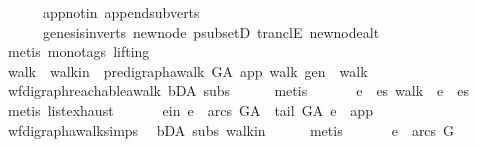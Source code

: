 \begin{isabellebody}
\ \ \ \ \ \ app{\isacharunderscore}{\kern0pt}notin\ append{\isacharunderscore}{\kern0pt}subverts\isanewline
\ \ \ \ \ \ genesis{\isacharunderscore}{\kern0pt}in{\isacharunderscore}{\kern0pt}verts\ new{\isacharunderscore}{\kern0pt}node\ psubsetD\ tranclE\ new{\isacharunderscore}{\kern0pt}node{\isacharunderscore}{\kern0pt}alt\isanewline
\ \ \ \ \isamarkupfalse%
\ {\isacharparenleft}{\kern0pt}metis\ {\isacharparenleft}{\kern0pt}mono{\isacharunderscore}{\kern0pt}tags{\isacharcomma}{\kern0pt}\ lifting{\isacharparenright}{\kern0pt}{\isacharparenright}{\kern0pt}\isanewline
\ \ \isamarkupfalse%
\ \isamarkupfalse%
\ walk\ \ walk{\isacharunderscore}{\kern0pt}in{\isacharcolon}{\kern0pt}\ {\isachardoublequoteopen}\ pre{\isacharunderscore}{\kern0pt}digraph{\isachardot}{\kern0pt}awalk\ G{\isacharunderscore}{\kern0pt}A\ app\ walk\ gen\ {\isasymand}\ walk\ {\isasymnoteq}\ {\isacharbrackleft}{\kern0pt}{\isacharbrackright}{\kern0pt}{\isachardoublequoteclose}\ \isanewline
\ \ \ \ \isamarkupfalse%
\ wf{\isacharunderscore}{\kern0pt}digraph{\isachardot}{\kern0pt}reachable{}{\isacharunderscore}{\kern0pt}awalk\ bD{\isacharunderscore}{\kern0pt}A\ subs\isanewline
\ \ \ \ \isamarkupfalse%
\ metis\ \isanewline
\ \ \isamarkupfalse%
\ \isamarkupfalse%
\ e\ \ {\isachardoublequoteopen}{\isasymexists}es{\isachardot}{\kern0pt}\ walk\ {\isacharequal}{\kern0pt}\ e\ {\isacharhash}{\kern0pt}\ es{\isachardoublequoteclose}\isanewline
\ \ \ \ \isamarkupfalse%
\ {\isacharparenleft}{\kern0pt}metis\ list{\isachardot}{\kern0pt}exhaust{\isacharparenright}{\kern0pt}\ \isanewline
\ \ \isamarkupfalse%
\ \isamarkupfalse%
\ e{\isacharunderscore}{\kern0pt}in{\isacharcolon}{\kern0pt}\ {\isachardoublequoteopen}e\ {\isasymin}\ arcs\ G{\isacharunderscore}{\kern0pt}A\ {\isasymand}\ tail\ G{\isacharunderscore}{\kern0pt}A\ e\ {\isacharequal}{\kern0pt}\ app{\isachardoublequoteclose}\isanewline
\ \ \ \ \isamarkupfalse%
\ wf{\isacharunderscore}{\kern0pt}digraph{\isachardot}{\kern0pt}awalk{\isacharunderscore}{\kern0pt}simps{\isacharparenleft}{\kern0pt}{}{\isacharparenright}{\kern0pt}\isanewline
\ \ bD{\isacharunderscore}{\kern0pt}A\ subs\ walk{\isacharunderscore}{\kern0pt}in\isanewline
\ \ \ \ \isamarkupfalse%
\ metis\ \isanewline
\ \ \isamarkupfalse%
\ \isamarkupfalse%
\ {\isachardoublequoteopen}e\ {\isasymnotin}\ arcs\ G{\isachardoublequoteclose}\ \isamarkupfalse%

\end{isabellebody}
